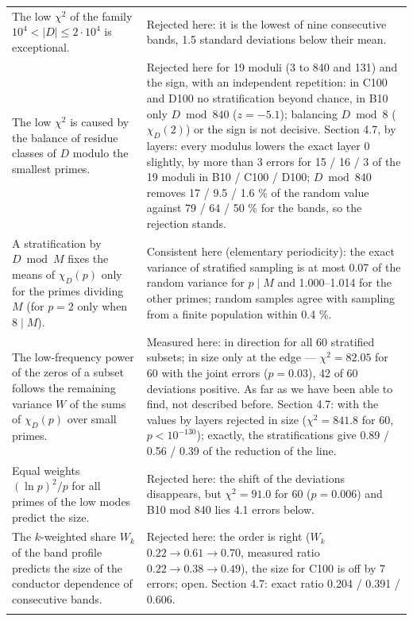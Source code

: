 \documentclass[
  10pt,
]{article}
\begin{document}
{\begin{longtable}[]{@{}
  >{\raggedright\arraybackslash}p{}
  >{\raggedright\arraybackslash}p{}@{}}
The low \(\chi^2\) of the family \(10^4 < |D| \le 2\cdot10^4\) is
exceptional. & Rejected here: it is the lowest of nine consecutive
bands, 1.5 standard deviations below their mean. \\ \addlinespace[2pt]
The low \(\chi^2\) is caused by the balance of residue classes of \(D\)
modulo the smallest primes. & Rejected here for 19 moduli (3 to 840 and
131) and the sign, with an independent repetition: in C100 and D100 no
stratification beyond chance, in B10 only \(D \bmod 840\)
(\(z = -5.1\)); balancing \(D \bmod 8\) (\(\chi_D(2)\)) or the sign is
not decisive. Section 4.7, by layers: every modulus lowers the exact
layer 0 slightly, by more than 3 errors for 15 / 16 / 3 of the 19 moduli
in B10 / C100 / D100; \(D \bmod 840\) removes 17 / 9.5 / 1.6 \% of the
random value against 79 / 64 / 50 \% for the bands, so the rejection
stands. \\ \addlinespace[2pt]
A stratification by \(D \bmod M\) fixes the means of \(\chi_D(p)\) only
for the primes dividing \(M\) (for \(p = 2\) only when \(8 \mid M\)). &
Consistent here (elementary periodicity): the exact variance of
stratified sampling is at most 0.07 of the random variance for
\(p \mid M\) and 1.000--1.014 for the other primes; random samples agree
with sampling from a finite population within 0.4 \%. \\ \addlinespace[2pt]
The low-frequency power of the zeros of a subset follows the remaining
variance \(W\) of the sums of \(\chi_D(p)\) over small primes. &
Measured here: in direction for all 60 stratified subsets; in size only
at the edge --- \(\chi^2 = 82.05\) for 60 with the joint errors
(\(p = 0.03\)), 42 of 60 deviations positive. As far as we have been
able to find, not described before. Section 4.7: with the values by
layers rejected in size (\(\chi^2 = 841.8\) for 60, \(p < 10^{-130}\));
exactly, the stratifications give 0.89 / 0.56 / 0.39 of the reduction of
the line. \\ \addlinespace[2pt]
Equal weights \((\ln p)^2/p\) for all primes of the low modes predict
the size. & Rejected here: the shift of the deviations disappears, but
\(\chi^2 = 91.0\) for 60 (\(p = 0.006\)) and B10 mod 840 lies 4.1 errors
below. \\ \addlinespace[2pt]
The \(k\)-weighted share \(W_k\) of the band profile predicts the size
of the conductor dependence of consecutive bands. & Rejected here: the
order is right (\(W_k\) \(0.22 \to 0.61 \to 0.70\), measured ratio
\(0.22 \to 0.38 \to 0.49\)), the size for C100 is off by 7 errors; open.
Section 4.7: exact ratio 0.204 / 0.391 / 0.606. \\ \addlinespace[2pt]

\end{longtable}}
\end{document}
